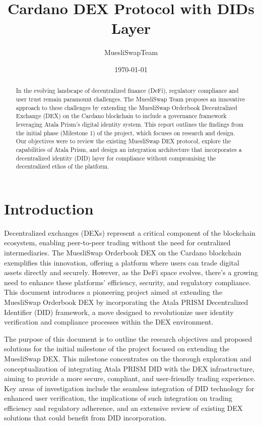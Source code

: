 \documentclass[11pt]{article}
\title{Cardano DEX Protocol with DIDs Layer}
\author{MuesliSwapTeam}
\date{\today}
\begin{document}
\maketitle
\vspace{3em}

\begin{abstract} \noindent
In the evolving landscape of decentralized finance (DeFi), regulatory compliance and user trust remain paramount challenges. The MuesliSwap Team proposes an innovative approach to these challenges by extending the MuesliSwap Orderbook Decentralized Exchange (DEX) on the Cardano blockchain to include a governance framework leveraging Atala Prism's digital identity system. This report outlines the findings from the initial phase (Milestone 1) of the project, which focuses on research and design. Our objectives were to review the existing MuesliSwap DEX protocol, explore the capabilities of Atala Prism, and design an integration architecture that incorporates a decentralized identity (DID) layer for compliance without compromising the decentralized ethos of the platform.

\end{abstract}
\newpage 

\tableofcontents
\newpage

\section{Introduction}
Decentralized exchanges (DEXs) represent a critical component of the blockchain ecosystem, enabling peer-to-peer trading without the need for centralized intermediaries. The MuesliSwap Orderbook DEX on the Cardano blockchain exemplifies this innovation, offering a platform where users can trade digital assets directly and securely. However, as the DeFi space evolves, there's a growing need to enhance these platforms' efficiency, security, and regulatory compliance. This document introduces a pioneering project aimed at extending the MuesliSwap Orderbook DEX by incorporating the Atala PRISM Decentralized Identifier (DID) framework, a move designed to revolutionize user identity verification and compliance processes within the DEX environment.

The purpose of this document is to outline the research objectives and proposed solutions for the initial milestone of the project focused on extending the MuesliSwap DEX. This milestone concentrates on the thorough exploration and conceptualization of integrating Atala PRISM DID with the DEX infrastructure, aiming to provide a more secure, compliant, and user-friendly trading experience. Key areas of investigation include the seamless integration of DID technology for enhanced user verification, the implications of such integration on trading efficiency and regulatory adherence, and an extensive review of existing DEX solutions that could benefit from DID incorporation.
\end{document}

